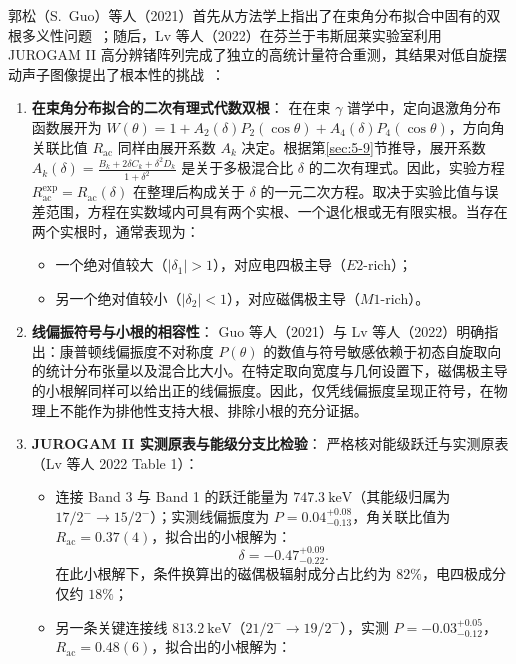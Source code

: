 郭松（S.~Guo）等人（2021）首先从方法学上指出了在束角分布拟合中固有的双根多义性问题~\cite{guo-2021-comment-transverse-wobbling-135pr}；随后，Lv 等人（2022）在芬兰于韦斯屈莱实验室利用 JUROGAM II 高分辨锗阵列完成了独立的高统计量符合重测，其结果对低自旋摆动声子图像提出了根本性的挑战~\cite{lv-2022-evidence-against-wobbling-135pr}：
\begin{enumerate}
\item \textbf{在束角分布拟合的二次有理式代数双根}：
在在束 $\gamma$ 谱学中，定向退激角分布函数展开为 $W(\theta) = 1 + A_2(\delta) P_2(\cos\theta) + A_4(\delta) P_4(\cos\theta)$，方向角关联比值 $R_{\mathrm{ac}}$ 同样由展开系数 $A_k$ 决定。根据第\ref{sec:5-9}节推导，展开系数 $A_k(\delta) = \frac{B_k + 2\delta C_k + \delta^2 D_k}{1 + \delta^2}$ 是关于多极混合比 $\delta$ 的二次有理式。因此，实验方程 $R_{\mathrm{ac}}^{\text{exp}} = R_{\mathrm{ac}}(\delta)$ 在整理后构成关于 $\delta$ 的一元二次方程。取决于实验比值与误差范围，方程在实数域内可具有两个实根、一个退化根或无有限实根。当存在两个实根时，通常表现为：
\begin{itemize}
\item 一个绝对值较大（$|\delta_1| > 1$），对应电四极主导（$E2$-rich）；
\item 另一个绝对值较小（$|\delta_2| < 1$），对应磁偶极主导（$M1$-rich）。
\end{itemize}
\item \textbf{线偏振符号与小根的相容性}：
Guo 等人（2021）与 Lv 等人（2022）明确指出：康普顿线偏振度不对称度 $P(\theta)$ 的数值与符号敏感依赖于初态自旋取向的统计分布张量以及混合比大小。在特定取向宽度与几何设置下，磁偶极主导的小根解同样可以给出正的线偏振度。因此，仅凭线偏振度呈现正符号，在物理上不能作为排他性支持大根、排除小根的充分证据。
\item \textbf{JUROGAM II 实测原表与能级分支比检验}：
严格核对能级跃迁与实测原表（Lv 等人 2022 Table 1）：
\begin{itemize}
\item 连接 Band 3 与 Band 1 的跃迁能量为 $747.3\ \mathrm{keV}$（其能级归属为 $17/2^- \to 15/2^-$）；实测线偏振度为 $P = 0.04_{-0.13}^{+0.08}$，角关联比值为 $R_{\mathrm{ac}} = 0.37(4)$，拟合出的小根解为：
\begin{equation}\label{eq:4-4-pr135-small-delta-747}
\delta = -0.47_{-0.22}^{+0.09}.
\end{equation}
在此小根解下，条件换算出的磁偶极辐射成分占比约为 $82\%$，电四极成分仅约 $18\%$；
\item 另一条关键连接线 $813.2\ \mathrm{keV}$（$21/2^- \to 19/2^-$），实测 $P = -0.03_{-0.12}^{+0.05}$，$R_{\mathrm{ac}} = 0.48(6)$，拟合出的小根解为：

\end{itemize}
\end{enumerate}
